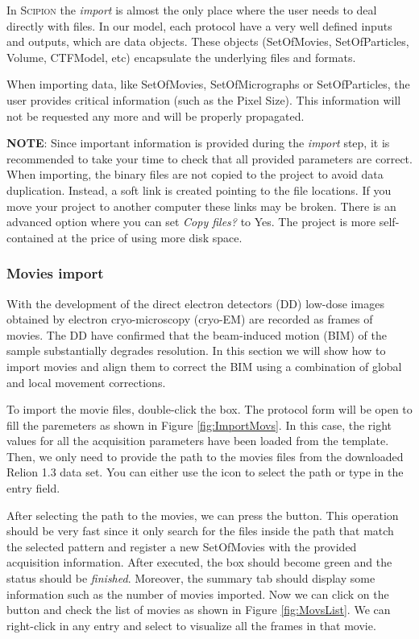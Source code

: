 \documentclass[12pt]{article} %
\newcommand{\scipion}{\textsc{Scipion} }
\begin{document}
In \scipion the \emph{import} is almost the only place where the user needs to deal
directly with files. In our model, each protocol have a very well defined 
inputs and outputs, which are data objects. These objects (SetOfMovies, SetOfParticles, Volume, CTFModel, etc)
encapsulate the underlying files and formats. 

When importing data, like SetOfMovies, SetOfMicrographs or SetOfParticles, the user provides
critical information (such as the Pixel Size). This information will not be requested
any more and will be properly propagated.

\textbf{NOTE}: Since important information is provided during the \emph{import} step, it is recommended
to take your time to check that all provided parameters are correct. When importing, the binary files
are not copied to the project to avoid data duplication. Instead, a soft link is created pointing 
to the file locations. If you move your project to another computer these links may be broken. There 
is an advanced option where you can set \emph{Copy files?} to Yes. The project is more self-contained
at the price of using more disk space.


\subsubsection{Movies import}
With the development of the direct electron detectors (DD) low-dose images obtained by electron cryo-microscopy (cryo-EM)
are recorded as frames of movies. The DD have confirmed that the beam-induced motion (BIM) of the sample substantially degrades resolution.
In this section we will show how to import movies and align them to correct the BIM using a combination of global and local movement 
corrections.

To import the movie files, double-click the  box. The protocol form will be open to fill the paremeters
as shown in Figure \ref{fig:ImportMovs}. In this case, the right values for all the acquisition parameters have been loaded
from the template. Then, we only need to provide the path to the movies files from the downloaded Relion 1.3 data set.
You can either use the  icon to select the path or type in the entry field.

After selecting the path to the movies, we can press the  button. This operation should be very fast
since it only search for the files inside the path that match the selected pattern and register a new SetOfMovies
with the provided acquisition information. After executed, the  box should become green and 
the status should be \emph{finished}. Moreover, the summary tab should display some information such as the number
of movies imported. Now we can click on the  button and check the list of movies as shown in Figure \ref{fig:MovsList}.
We can right-click in any entry and select  to visualize all the frames in that movie.
\end{document}
